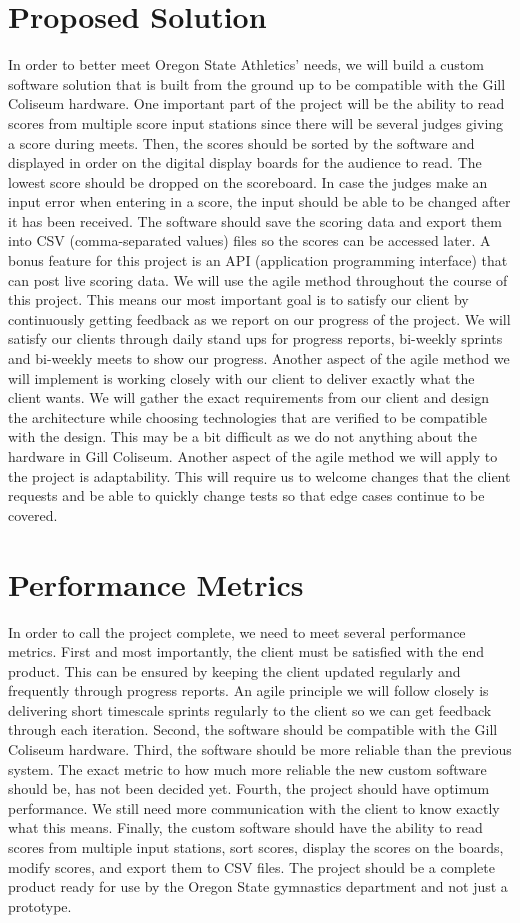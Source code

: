 \documentclass[a4paper, 10pt,draftclsnofoot,onecolumn]{article}\usepackage[letterpaper,margin=0.75in]
\begin{document}
\section{Proposed Solution}
In order to better meet Oregon State Athletics' needs, we will build a custom software solution that is built from the ground up to be compatible with the Gill Coliseum hardware. One important part of the project will be the ability to read scores from multiple score input stations since there will be several judges giving a score during meets. Then, the scores should be sorted by the software and displayed in order on the digital display boards for the audience to read. The lowest score should be dropped on the scoreboard. In case the judges make an input error when entering in a score, the input should be able to be changed after it has been received. The software should save the scoring data and export them into CSV (comma-separated values) files so the scores can be accessed later. A bonus feature for this project is an API (application programming interface) that can post live scoring data. We will use the agile method throughout the course of this project. This means our most important goal is to satisfy our client by continuously getting feedback as we report on our progress of the project. We  will satisfy our clients through daily stand ups for progress reports, bi-weekly sprints and bi-weekly meets to show our progress. Another aspect of the agile method we will implement is working closely with our client to deliver exactly what the client wants. We will gather the exact requirements from our client and design the architecture while choosing technologies that are verified to be compatible with the design. This may be a bit difficult as we do not anything about the hardware in Gill Coliseum. Another aspect of the agile method we will apply to the project is adaptability. This will require us to welcome changes that the client requests and be able to quickly change tests so that edge cases continue to be covered.

\section{Performance Metrics}
In order to call the project complete, we need to meet several performance metrics. First and most importantly, the client must be satisfied with the end product. This can be ensured by keeping the client updated regularly and frequently through progress reports. An agile principle we will follow closely is delivering short timescale sprints regularly to the client so we can get feedback through each iteration. Second, the software should be compatible with the Gill Coliseum hardware. Third, the software should be more reliable than the previous system. The exact metric to how much more reliable the new custom software should be, has not been decided yet. Fourth, the project should have optimum performance. We still need more communication with the client to know exactly what this means. Finally, the custom software should have the ability to read scores from multiple input stations, sort scores, display the scores on the boards, modify scores, and export them to CSV files. The project should be a complete product ready for use by the Oregon State gymnastics department and not just a prototype.
\end{document}
